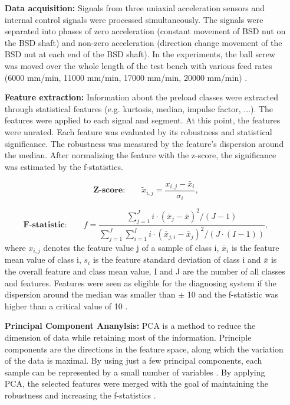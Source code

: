 \begin{itemize}
    \item [\textbf{Data acquisition:}] Signals from three uniaxial acceleration sensors and internal control signals were processed simultaneously. The signals were separated into phases of zero acceleration (constant movement of BSD nut on the BSD shaft) and non-zero acceleration (direction change movement of the BSD nut at each end of the BSD shaft). In the experiments, the ball screw was moved over the whole length of the test bench with various feed rates (6000 mm/min, 11000 mm/min, 17000 mm/min, 20000 mm/min) \cite{Denkena2021}.
    \item [\textbf{Feature extraction:}] Information about the preload classes were extracted through statistical features (e.g. kurtosis, median, impulse factor, ...). The features were applied to each signal and segment. At this point, the features were unrated. Each feature was evaluated by its robustness and statistical significance. The robustness was measured by the feature's dispersion around the median. After normalizing the feature with the z-score, the significance was estimated by the f-statistics.
    
    \begin{equation}
        \textbf{Z-score:}\qquad \tilde{x}_{i,j} = \frac{x_{i,j} - \bar x_{i}}{\sigma_{i}},
    \end{equation}
    
    \begin{equation}
        \textbf{F-statistic:}\qquad f = \frac{\sum_{j=1}^{J} i \cdot (\bar x_{j} -\bar x)^{2}/(J-1)}{\sum_{j=1}^{J} \sum_{i=1}^{I} i \cdot (\bar x_{j,i} -\bar x_{j})^{2}/(J \cdot (I-1))},
    \end{equation}
    where ${x}_{i,j}$ denotes the feature value j of a sample of class i, $\bar{x}_{i}$ is the feature mean value of class i, ${s}_{i}$ is the feature standard deviation of class i and $\bar{x}$ is the overall feature and class mean value, I and J are the number of all classes and features. Features were seen as eligible for the diagnosing system if the dispersion around the median was smaller than $\pm$ 10 and the f-statistic was higher than a critical value of 10 \cite{Denkena2021}. 
    
    \item [\textbf{Principal Component Ananylsis:}] 
    PCA is a method to reduce the dimension of data while retaining most of the information. Principle components are the directions in the feature space, along which the variation of the data is maximal. By using just a few principal components, each sample can be represented by a small number of variables \cite{Ringner2008}. By applying PCA, the selected features were merged with the goal of maintaining the robustness and increasing the f-statistics \cite{Denkena2021}.
    

\end{itemize}
